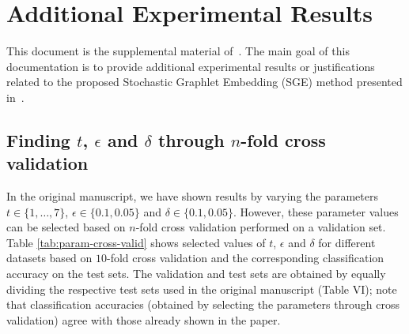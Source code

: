 \documentclass[journal]{IEEEtran}
\theoremstyle{definition}
\newcommand{\tab}[1]{Table \ref{#1}}
\begin{document}



%
\section{Additional Experimental Results}
This document is the supplemental material of~\cite{Dutta2018SGE}. The main goal of this documentation is to provide additional experimental results or justifications related to the proposed Stochastic Graphlet Embedding (SGE) method presented in~\cite{Dutta2018SGE}.

\subsection{Finding $t$, $\epsilon$ and $\delta$ through $n$-fold cross validation}
In the original manuscript, we have shown results by varying the parameters $t\in\lbrace1,\ldots,7\rbrace$, $\epsilon\in\lbrace0.1, 0.05\rbrace$ and $\delta\in\lbrace0.1, 0.05\rbrace$. However, these parameter values can be selected based on $n$-fold cross validation performed on a validation set. \tab{tab:param-cross-valid} shows selected values of $t$, $\epsilon$ and $\delta$ for different datasets based on $10$-fold cross validation and the corresponding classification accuracy on the test sets. The validation and test sets are obtained by equally dividing the respective test sets used in the original manuscript (Table VI); note that classification accuracies (obtained by selecting the parameters through cross validation) agree with those already shown in the paper.
\end{document}
